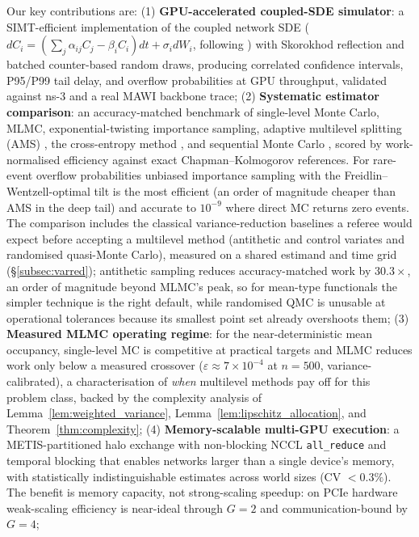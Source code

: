 \documentclass{ieeeaccess}
\begin{document}
Our key contributions are:
(1) \textbf{GPU-accelerated coupled-SDE simulator}: a SIMT-efficient implementation of the
coupled network SDE ($dC_i = (\sum_j \alpha_{ij}C_j - \beta_i C_i)dt + \sigma_i dW_i$, following
\cite{kang2007,harrison1985}) with Skorokhod reflection and batched counter-based random draws,
producing correlated confidence intervals, P95/P99 tail delay, and overflow probabilities at GPU
throughput, validated against ns-3 and a real MAWI backbone trace;
(2) \textbf{Systematic estimator comparison}: an accuracy-matched benchmark of single-level Monte
Carlo, MLMC, exponential-twisting importance sampling, adaptive multilevel splitting (AMS)
\cite{cerou2007adaptive}, the cross-entropy method \cite{rubinstein2004cross}, and sequential
Monte Carlo \cite{del2004feynman}, scored by work-normalised efficiency against exact
Chapman--Kolmogorov references. For rare-event overflow probabilities unbiased importance sampling
with the Freidlin--Wentzell-optimal tilt is the most efficient (an order of magnitude cheaper than
AMS in the deep tail) and accurate to $10^{-9}$ where direct MC returns zero events. The
comparison includes the classical variance-reduction baselines a referee would expect before
accepting a multilevel method (antithetic and control variates and randomised quasi-Monte
Carlo), measured on a shared estimand and time grid (\S\ref{subsec:varred}); antithetic sampling
reduces accuracy-matched work by $30.3\times$, an order of magnitude beyond MLMC's peak, so for
mean-type functionals the simpler technique is the right default, while randomised QMC is
unusable at operational tolerances because its smallest point set already overshoots them;
(3) \textbf{Measured MLMC operating regime}: for the near-deterministic mean occupancy,
single-level MC is competitive at practical targets and MLMC reduces work only below a measured
crossover ($\varepsilon\approx7\times10^{-4}$ at $n{=}500$, variance-calibrated), a characterisation of \emph{when} multilevel methods pay
off for this problem class, backed by the complexity analysis of
Lemma~\ref{lem:weighted_variance}, Lemma~\ref{lem:lipschitz_allocation}, and
Theorem~\ref{thm:complexity};
(4) \textbf{Memory-scalable multi-GPU execution}: a METIS-partitioned halo exchange with
non-blocking NCCL \texttt{all\_reduce} and temporal blocking that enables networks larger than a
single device's memory, with statistically indistinguishable estimates across world sizes
(CV $<0.3\%$). The benefit is memory capacity, not strong-scaling speedup: on PCIe hardware
weak-scaling efficiency is near-ideal through $G{=}2$ and communication-bound by $G{=}4$;
\end{document}
